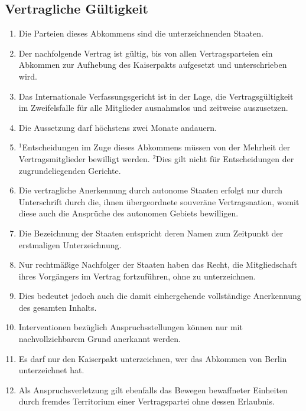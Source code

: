 \documentclass{article}
\begin{document}
\subsection{Vertragliche Gültigkeit}
\begin{enumerate}[(1)]
    \item Die Parteien dieses Abkommens sind die unterzeichnenden Staaten.
    \item Der nachfolgende Vertrag ist gültig, bis von allen Vertragsparteien ein Abkommen zur Aufhebung des Kaiserpakts aufgesetzt und unterschrieben wird.
    \item Das Internationale Verfassungsgericht ist in der Lage, die Vertragsgültigkeit im Zweifelsfalle für alle Mitglieder ausnahmslos und zeitweise auszusetzen.
    \item Die Aussetzung darf höchstens zwei Monate andauern.
    \item ${^1}$Entscheidungen im Zuge dieses Abkommens müssen von der Mehrheit der Vertragsmitglieder bewilligt werden. ${^2}$Dies gilt nicht für Entscheidungen der zugrundeliegenden Gerichte.
    \item Die vertragliche Anerkennung durch autonome Staaten erfolgt nur durch Unterschrift durch die, ihnen übergeordnete souveräne Vertragsnation, womit diese auch die Ansprüche des autonomen Gebiets bewilligen.
    \item Die Bezeichnung der Staaten entspricht deren Namen zum Zeitpunkt der erstmaligen Unterzeichnung.
    \item Nur rechtmäßige Nachfolger der Staaten haben das Recht, die Mitgliedschaft ihres Vorgängers im Vertrag fortzuführen, ohne zu unterzeichnen.
    \item Dies bedeutet jedoch auch die damit einhergehende vollständige Anerkennung des gesamten Inhalts.
    \item Interventionen bezüglich Anspruchsstellungen können nur mit nachvollziehbarem Grund anerkannt werden.
    \item Es darf nur den Kaiserpakt unterzeichnen, wer das Abkommen von Berlin unterzeichnet hat.
    \item Als Anspruchsverletzung gilt ebenfalls das Bewegen bewaffneter Einheiten durch fremdes Territorium einer Vertragspartei ohne dessen Erlaubnis.
\end{enumerate}
\end{document}
